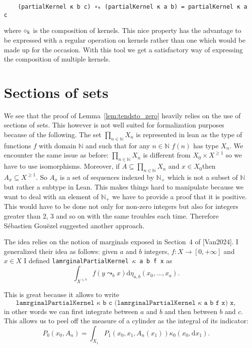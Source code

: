 \documentclass{article}
\newcommand{\N}{\mathbb{N}}
\newcommand{\Xge}[1]{X^{\ge#1}}
\newcommand{\Xle}[1]{X^{\le#1}}
\newcommand{\dx}{\mathrm{d}x}
\theoremstyle{definition}
\theoremstyle{remark}
\begin{document}
	\begin{lstlisting}
	(partialKernel κ b c) ∘ₖ (partialKernel κ a b) = partialKernel κ a c
	\end{lstlisting}
	where $\circ_{\rm k}$ is the composition of kernels. This nice property has the advantage to be expressed with a regular operation on kernels rather than one which would be made up for the occasion. With this tool we get a satisfactory way of expressing the composition of multiple kernels.

	\section{Sections of sets}

	We see that the proof of Lemma~\ref{lem:tendsto_zero} heavily relies on the use of sections of sets. This however is not well suited for formalization purposes because of the following. The set $\prod_{n\in\N} X_n$ is represented in lean as the type of functions $f$ with domain $\N$ and such that for any $n \in \N$ $f(n)$ has type $X_n$. We encounter the same issue as before: $\prod_{n\in\N} X_n$ is different from $X_0 \times \Xge{1}$ so we have to use isomorphisms. Moreover, if $A \subseteq \prod_{n\in\N} X_n$ and $x \in X_0$then $A_x \subseteq \Xge{1}$.
	So $A_x$ is a set of sequences indexed by $\N_+$ which is not a subset of $\N$ but rather a subtype in Lean. This makes things hard to manipulate because we want to deal with an element of $\N_+$ we have to provide a proof that it is positive. This would have to be done not only for non-zero integers but also for integers greater than $2$, $3$ and so on with the same troubles each time. Therefore Sébastien Gouëzel suggested another approach.

	The idea relies on the notion of marginals exposed in Section~4 of [Van2024]. I generalized their idea as follows: given $a$ and $b$ integers, $f : X \to [0,+\infty]$ and $x \in X$ I defined \texttt{lamrginalPartialKernel $\kappa$ a b f x} as
	$$\int_{\Xle{b}} f(y \leadsto_b x) \mathrm{d}\eta_{a,b}(x_0,...,x_a).$$

	This is great because it allows to write $$\texttt{lamrginalPartialKernel $\kappa$ b c (lamrginalPartialKernel $\kappa$ a b f x) x},$$
	in other words we can first integrate between $a$ and $b$ and then between $b$ and $c$. This allows us to peel off the measure of a cylinder as the integral of its indicator:
	$$P_0(x_0, A_n) = \int_{X_1} P_1(x_0, x_1, A_n(x_1)) \kappa_0(x_0,\dx_1).$$
\end{document}
